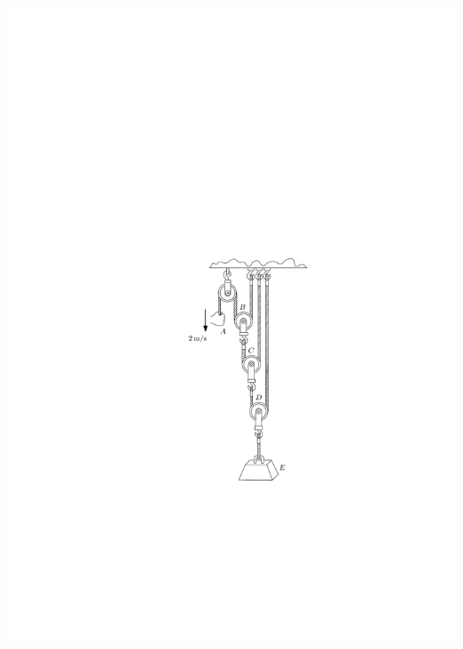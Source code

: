 \documentclass[a4paper,12pt]{article}
\begin{document}
\begin{enumerate}
		\vspace{-1cm}
		\begin{flushright}
			\includegraphics[scale=1.3]{images/draw_9}
		\end{flushright}
		
		
	\end{enumerate}
\end{document}
